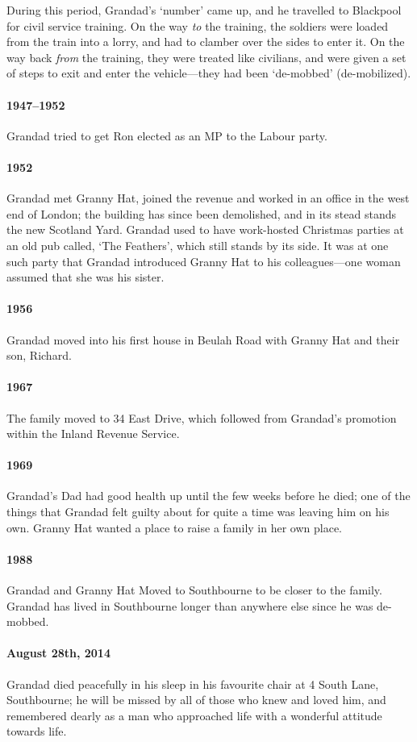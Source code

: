   During this period, Grandad's `number' came up, and he travelled to Blackpool for 
  civil service training. On the way \emph{to} the training, the soldiers were loaded from 
  the train into a lorry, and had to clamber over the sides to enter it. On the 
  way back \emph{from} the training, they were treated like civilians, and were 
  given a set of steps to exit and enter the vehicle---they had been `de-mobbed' (de-mobilized).

  \paragraph{1947--1952} Grandad tried to get Ron elected as an MP to the Labour party. 

\paragraph{1952} Grandad met Granny Hat, joined the revenue and worked in an office 
  in the west end of London; the building has since been demolished, and in its stead 
  stands the new Scotland Yard. 
  Grandad used to have work-hosted Christmas parties at an old pub called, `The Feathers', which still stands by its side. 
  It was at one such party that Grandad introduced Granny Hat to his colleagues---one woman
  assumed that she was his sister.

\paragraph{1956} Grandad moved into his first house in Beulah Road with Granny Hat and their son, Richard.
\paragraph{1967} The family moved to 34 East Drive, which followed from Grandad's promotion within 
the Inland Revenue Service.
\paragraph{1969} Grandad's Dad had good health up until the few weeks before he died; one 
of the things that Grandad felt guilty about for quite a time was leaving him on his own. Granny Hat  wanted 
a place to raise a family in her own place.
\paragraph{1988} Grandad and Granny Hat Moved to Southbourne to be closer to the family. Grandad 
  has lived in Southbourne longer than anywhere else since he was de-mobbed.

  \paragraph{August 28th, 2014} Grandad died peacefully in his sleep in his favourite chair at 4 South Lane, Southbourne; he will be missed by all of those
  who knew and loved him, and remembered dearly as a man who approached life with a wonderful attitude
  towards life.
